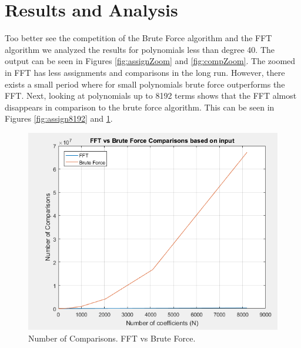 \documentclass[12pt]{article}
\begin{document}
        \section{Results and Analysis} 
        \indent\par{Too better see the competition of the Brute Force algorithm and the FFT algorithm we analyzed the results for polynomials less than degree 40. The output can be seen in Figures \ref{fig:assignZoom} and \ref{fig:compZoom}. The zoomed in FFT has less assignments and comparisons in the long run. However, there exists a small period where for small polynomials brute force outperforms the FFT. Next, looking at polynomials up to 8192 terms shows that the FFT almost disappears in comparison to the brute force algorithm. This can be seen in Figures \ref{fig:assign8192} and \ref{fig:comp8192}.}
        \begin{figure}[H]
            \centerline{\includegraphics[scale=0.5]{images/BruteVSFFT_8192_Comparisons}}
            \caption{Number of Comparisons. FFT vs Brute Force.}
            \label{fig:comp8192} 
        \end{figure}
\end{document}
